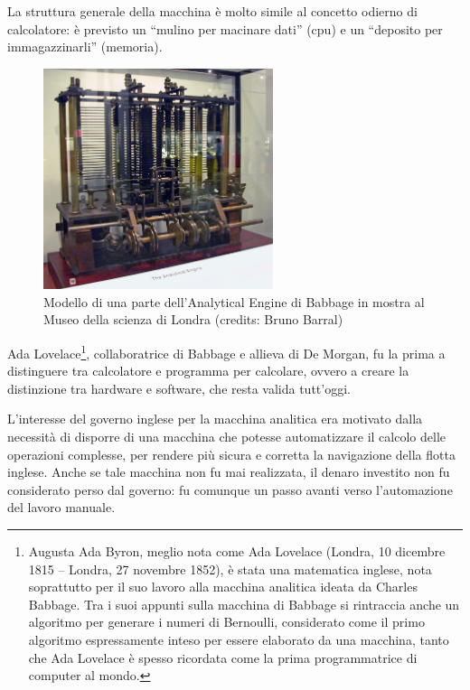 La struttura generale della macchina è molto simile al concetto odierno di calcolatore: è previsto un ``mulino per macinare dati'' (cpu) e un ``deposito per immagazzinarli'' (memoria).

\begin{figure}[hbt]
  \centering
  \includegraphics[width=0.6\textwidth]{img/AnalyticalMachine_Babbage_London.jpg}
  \caption{Modello di una parte dell'Analytical Engine di Babbage in mostra al Museo della scienza di Londra (credits: Bruno Barral)}
  \label{}
\end{figure}


Ada Lovelace\footnote{Augusta Ada Byron, meglio nota come Ada Lovelace (Londra, 10 dicembre 1815 – Londra, 27 novembre 1852), è stata una matematica inglese, nota soprattutto per il suo lavoro alla macchina analitica ideata da Charles Babbage. Tra i suoi appunti sulla macchina di Babbage si rintraccia anche un algoritmo per generare i numeri di Bernoulli, considerato come il primo algoritmo espressamente inteso per essere elaborato da una macchina, tanto che Ada Lovelace è spesso ricordata come la prima programmatrice di computer al mondo.}, collaboratrice di Babbage e allieva di De Morgan, fu la prima a distinguere tra calcolatore e programma per calcolare, ovvero a creare la distinzione tra hardware e software, che resta valida tutt'oggi.

L'interesse del governo inglese per la macchina analitica era motivato dalla necessità di disporre di una macchina che potesse automatizzare il calcolo delle operazioni complesse, per rendere più sicura e corretta la navigazione della flotta inglese. Anche se tale macchina non fu mai realizzata, il denaro investito non fu considerato perso dal governo: fu comunque un passo avanti verso l'automazione del lavoro manuale.

